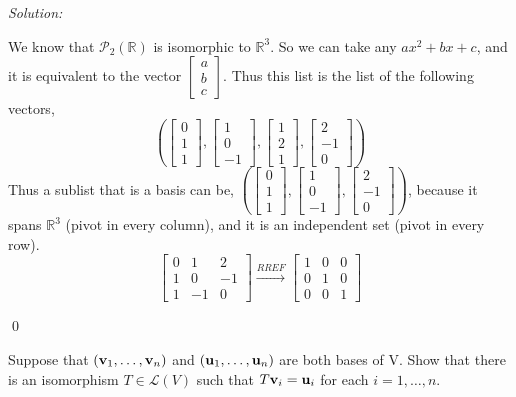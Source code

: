 \documentclass[11 pt]{article}
\newenvironment{problem}[2][Problem]{\begin{trivlist}
\item[\hskip \labelsep {\bfseries #1}\hskip \labelsep {\bfseries #2.}]}{\end{trivlist}}
\newenvironment{sol}
    {\emph{Solution:}
    }
    {
    \qed
    }
\theoremstyle{definition}
\newcommand{\R}{\mathbb{R}} %
\renewcommand{\b}{\beta}
\newcommand{\vv}[1]{\textbf v_{#1}}
\newcommand{\vu}[1]{\textbf u_{#1}}
\newcommand{\poly}[2]{\mathscr{P}_#2(#1)}
\begin{document}
\begin{sol}
We know that $\poly{\R}{2}$ is isomorphic to $\R^3$. So we can take any $ax^2+bx+c$, and it is equivalent to the vector $\begin{bmatrix}a\\b\\c\end{bmatrix}$. Thus this list is the list of the following vectors, 
\[\left (\begin{bmatrix}0\\1\\1\end{bmatrix}, \begin{bmatrix}1\\0\\-1\end{bmatrix}, \begin{bmatrix}1\\2\\1\end{bmatrix}, \begin{bmatrix}2\\-1\\0\end{bmatrix}\right )\]
Thus a sublist that is a basis can be, $\left (\begin{bmatrix}0\\1\\1\end{bmatrix}, \begin{bmatrix}1\\0\\-1\end{bmatrix}, \begin{bmatrix}2\\-1\\0\end{bmatrix}\right )$, because it spans $\R^3$ (pivot in every column), and it is an independent set (pivot in every row).
\[\begin{bmatrix}
0 & 1 & 2\\
1 & 0 & -1\\
1 & -1 & 0
\end{bmatrix}\xrightarrow{RREF}\begin{bmatrix}
1 & 0 & 0\\
0 & 1 & 0\\
0 & 0 & 1 
\end{bmatrix}
\]
\end{sol}
\begin{problem}{3.2.22}
Suppose that $(\vv{1},\dots,\vv{n})$ and $(\vu{1},\dots,\vu{n})$ are both bases of V. Show that there is an isomorphism $T\in\mathcal{L}(V)$ such that $T\vv{i}=\vu{i}$ for each $i=1,\dots,n$.
\end{problem}
\end{document}
